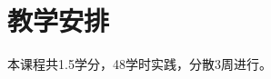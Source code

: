\documentclass[10pt]{elegantnote}
\begin{document}
\begin{sloppypar}
\section{教学安排}

本课程共1.5学分，48学时实践，分散3周进行。



\end{sloppypar}
\end{document}
